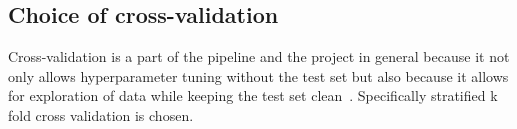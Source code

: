 \subsection{Choice of cross-validation}
Cross-validation is a part of the pipeline and the project in general because it not only allows hyperparameter tuning without the test set but also because it allows for exploration of data while keeping the test set clean~\cite{james-statistical-learning}. Specifically stratified k fold cross validation is chosen.
